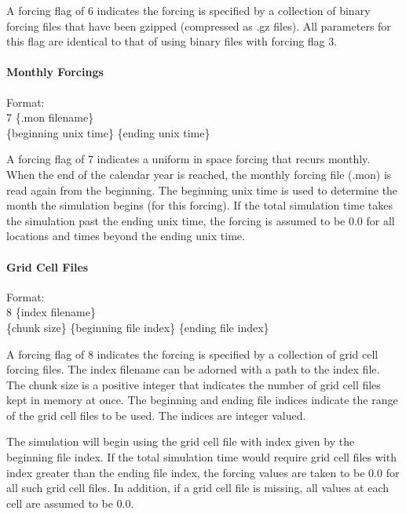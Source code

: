 \documentclass[12pt]{article}
\newenvironment{codeindent}
{\begin{list}{}
        {\setlength{\leftmargin}{.1in}}
        \item[]
}
{\end{list}}
\begin{document}
 A forcing flag of 6 indicates the forcing is specified by a collection of binary forcing files that have been gzipped (compressed as .gz files). All parameters for this flag are identical to that of using binary files with forcing flag 3.

 
\paragraph{Monthly Forcings} \label{sec: monthly forcings}

\begin{codeindent}
 Format: \\
 7 \{.mon filename\} \\
 \{beginning unix time\} \{ending unix time\}
\end{codeindent}

A forcing flag of 7 indicates a uniform in space forcing that recurs monthly. When the end of the calendar year is reached, the monthly forcing file (.mon) is read again from the beginning. The beginning unix time is used to determine the month the simulation begins (for this forcing). If the total simulation time takes the simulation past the ending unix time, the forcing is assumed to be 0.0 for all locations and times beyond the ending unix time.

\paragraph{Grid Cell Files} \label{sec: grid cell files}

\begin{codeindent}
 Format: \\
 8 \{index filename\} \\
 \{chunk size\} \{beginning file index\} \{ending file index\}
\end{codeindent}
 
A forcing flag of 8 indicates the forcing is specified by a collection of grid cell forcing files. The index filename can be adorned with a path to the index file. The chunk size is a positive integer that indicates the number of grid cell files kept in memory at once. The beginning and ending file indices indicate the range of the grid cell files to be used. The indices are integer valued.
 
The simulation will begin using the grid cell file with index given by the beginning file index. If the total simulation time would require grid cell files with index greater than the ending file index, the forcing values are taken to be 0.0 for all such grid cell files. In addition, if a grid cell file is missing, all values at each cell are assumed to be 0.0.
\end{document}
